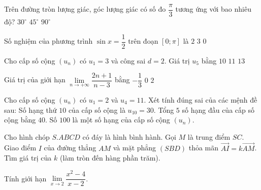 \begin{ex}
Trên đường tròn lượng giác, góc lượng giác có số đo $\dfrac{\pi}{3}$ tương ứng với bao nhiêu độ?
{$30^\circ$}
{$45^\circ$}
{$90^\circ$}
\end{ex}

\begin{ex}
Số nghiệm của phương trình $\sin x = \dfrac{1}{2}$ trên đoạn $[0;\pi]$ là
{\True $2$}
{$3$}
{$0$}
\end{ex}

\begin{ex}
Cho cấp số cộng $(u_n)$ có $u_1 = 3$ và công sai $d = 2$. Giá trị $u_5$ bằng
{$10$}
{\True $11$}
{$13$}
\end{ex}

\begin{ex}
Giá trị của giới hạn $\lim\limits_{n \to +\infty} \dfrac{2n+1}{n-3}$ bằng
{$-\dfrac{1}{3}$}
{$0$}
{\True $2$}
\end{ex}

\begin{ex}
Cho cấp số cộng $(u_n)$ có $u_1 = 2$ và $u_4 = 11$. Xét tính đúng sai của các mệnh đề sau:
{Số hạng thứ $10$ của cấp số cộng là $u_{10} = 30$.}
{\True Tổng $5$ số hạng đầu của cấp số cộng bằng $40$.}
{Số $100$ là một số hạng của cấp số cộng $(u_n)$.}
\end{ex}

\begin{ex}
Cho hình chóp $S.ABCD$ có đáy là hình bình hành. Gọi $M$ là trung điểm $SC$. Giao điểm $I$ của đường thẳng $AM$ và mặt phẳng $(SBD)$ thỏa mãn $\overrightarrow{AI} = k \overrightarrow{AM}$. Tìm giá trị của $k$ (làm tròn đến hàng phần trăm).
\end{ex}

\begin{bt}
Tính giới hạn $\lim\limits_{x \to 2} \dfrac{x^2 - 4}{x - 2}$.
\end{bt}
